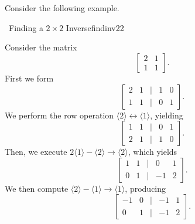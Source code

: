         \pagebreak
        \vphantom
        \\
        \\
        Consider the following example.
        \begin{example}{\Difficulty\,\Difficulty\,\,Finding a \(2\times 2\) Inverse}{findinv22}
            
            Consider the matrix 
            \begin{equation*}
                \begin{bmatrix}
                    2 & 1 \\
                    1 & 1
                \end{bmatrix}.
            \end{equation*}
            First we form
            \begin{equation*}
                \begin{bmatrix}
                    2 & 1 & | & 1 & 0 \\
                    1 & 1 & | & 0 & 1
                \end{bmatrix}.
            \end{equation*}
            We perform the row operation \(\langle 2\rangle\leftrightarrow\langle1\rangle\), yielding
            \begin{equation*}
                \begin{bmatrix}
                    1 & 1 & | & 0 & 1 \\
                    2 & 1 & | & 1 & 0
                \end{bmatrix}.
            \end{equation*}
            Then, we execute \(2\langle1\rangle-\langle2\rangle\to\langle2\rangle\), which yields
            \begin{equation*}
                \begin{bmatrix}
                    1 & 1 & | & 0 & 1 \\
                    0 & 1 & | & -1 & 2
                \end{bmatrix}.
            \end{equation*}
            We then compute \(\langle2\rangle-\langle1\rangle\to\langle 1\rangle\), producing
            \begin{equation*}
                \begin{bmatrix}
                    -1 & 0 & | & -1 & 1 \\
                    0 & 1 & | & -1 & 2
                \end{bmatrix}.

\end{equation*}
\end{example}

